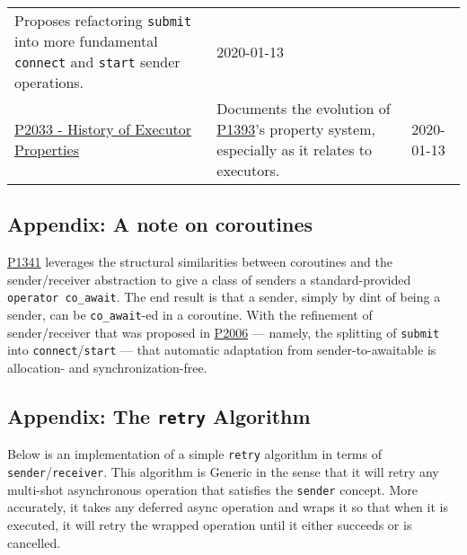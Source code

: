 \documentclass[a4paper,12pt,notitlepage,twoside,openright]{article}
\begin{document}
\begin{longtable}[]{@{}lll@{}}
\begin{minipage}[t]{0.54\columnwidth}
Proposes refactoring \texttt{submit} into more fundamental
\texttt{connect} and \texttt{start} sender
operations.\strut
\end{minipage} & \begin{minipage}[t]{0.05\columnwidth}\raggedright
2020-01-13\strut
\end{minipage}\tabularnewline
\begin{minipage}[t]{0.32\columnwidth}\raggedright
\href{https://wg21.link/P2033}{P2033 - History of Executor
Properties}\strut
\end{minipage} & \begin{minipage}[t]{0.54\columnwidth}\raggedright
Documents the evolution of \href{https://wg21.link/P1393}{P1393}'s
property system, especially as it relates to executors.\strut
\end{minipage} & \begin{minipage}[t]{0.05\columnwidth}\raggedright
2020-01-13\strut
\end{minipage}\tabularnewline
\bottomrule
\end{longtable}

\hypertarget{appendix-a-note-on-coroutines}{%
\subsection{Appendix: A note on
coroutines}\label{appendix-a-note-on-coroutines}}

\href{http://wg21.link/P1341}{P1341} leverages the structural
similarities between coroutines and the sender/receiver abstraction to
give a class of senders a standard-provided
\texttt{operator co_await}. The end result is that a sender,
simply by dint of being a sender, can be
\texttt{co_await}-ed in a coroutine. With the refinement of
sender/receiver that was proposed in
\href{https://wg21.link/P2006}{P2006} --- namely, the splitting of
\texttt{submit} into
\texttt{connect}/\texttt{start} --- that
automatic adaptation from sender-to-awaitable is allocation- and
synchronization-free.

\hypertarget{appendix-the-retry-algorithm}{%
\subsection{\texorpdfstring{Appendix: The \texttt{retry}
Algorithm}{Appendix: The  Algorithm}}\label{appendix-the-retry-algorithm}}

Below is an implementation of a simple \texttt{retry}
algorithm in terms of
\texttt{sender}/\texttt{receiver}. This
algorithm is Generic in the sense that it will retry any multi-shot
asynchronous operation that satisfies the \texttt{sender}
concept. More accurately, it takes any deferred async operation and
wraps it so that when it is executed, it will retry the wrapped
operation until it either succeeds or is cancelled.
\end{document}
